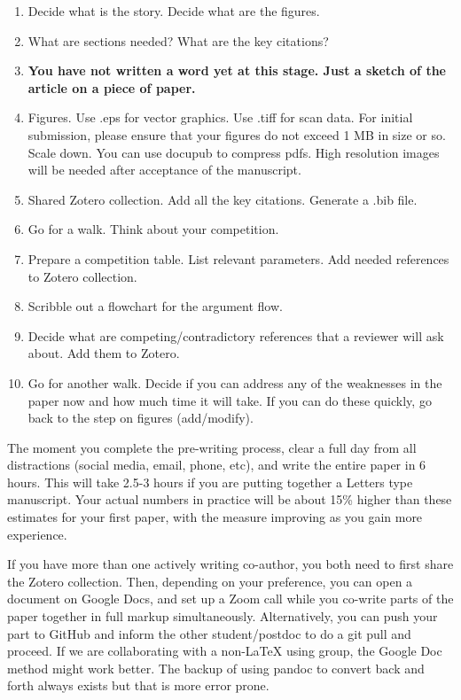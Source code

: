 \documentclass[12 pt]{article}
\begin{document}
\begin{enumerate}
\item Decide what is the story. Decide what are the figures.
\item What are sections needed? What are the key citations?
\item \textbf{You have not written a word yet at this stage. Just a sketch of the article on a piece of paper.}
\item Figures. Use .eps for vector graphics. Use .tiff for scan data. For initial submission, please ensure that your figures do not exceed 1 MB in size or so. Scale down. You can use docupub to compress pdfs. High resolution images will be needed after acceptance of the manuscript.
\item Shared Zotero collection. Add all the key citations. Generate a .bib file.
\item Go for a walk. Think about your competition.
\item Prepare a competition table. List relevant parameters. Add needed references to Zotero collection.
\item Scribble out a flowchart for the argument flow.
\item Decide what are competing/contradictory references that a reviewer will ask about. Add them to Zotero.
\item Go for another walk. Decide if you can address any of the weaknesses in the paper now and how much time it will take. If you can do these quickly, go back to the step on figures (add/modify).
\end{enumerate}

The moment you complete the pre-writing process, clear a full day from all distractions (social media, email, phone, etc), and write the entire paper in 6 hours. This will take 2.5-3 hours if you are putting together a Letters type manuscript. Your actual numbers in practice will be about 15\% higher than these estimates for your first paper, with the measure improving as you gain more experience.

If you have more than one actively writing co-author, you both need to first share the Zotero collection. Then, depending on your preference, you can open a document on Google Docs, and set up a Zoom call while you co-write parts of the paper together in full markup simultaneously. Alternatively, you can push your part to GitHub and inform the other student/postdoc to do a git pull and proceed. If we are collaborating with a non-LaTeX using group, the Google Doc method might work better. The backup of using pandoc to convert back and forth always exists but that is more error prone.
\end{document}

